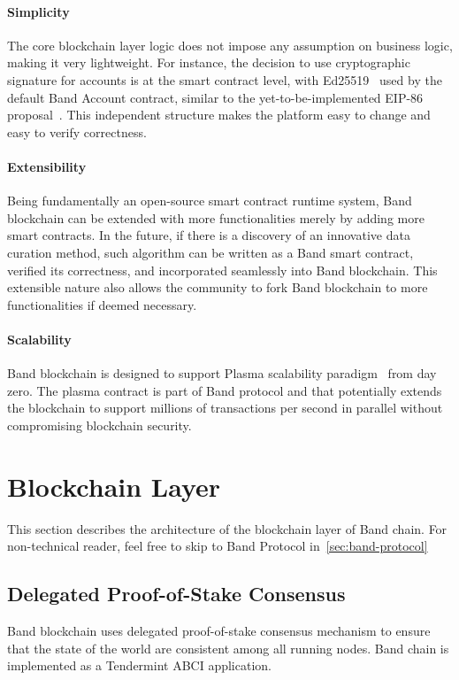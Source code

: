\documentclass[letterpaper,11pt]{article}
\begin{document}
\paragraph{Simplicity}
The core blockchain layer logic does not impose any assumption on business logic, making it very lightweight. For instance, the decision to use cryptographic signature for accounts is at the smart contract level, with Ed25519~\cite{bernstein2012high} used by the default Band Account contract, similar to the yet-to-be-implemented EIP-86 proposal~\cite{eip86,eip86research}. This independent structure makes the platform easy to change and easy to verify correctness.

\paragraph{Extensibility}
Being fundamentally an open-source smart contract runtime system, Band blockchain can be extended with more functionalities merely by adding more smart contracts. In the future, if there is a discovery of an innovative data curation method, such algorithm can be written as a Band smart contract, verified its correctness, and incorporated seamlessly into Band blockchain. This extensible nature also allows the community to fork Band blockchain to more functionalities if deemed necessary.

\paragraph{Scalability}
Band blockchain is designed to support Plasma scalability paradigm~\cite{poon2017plasma} from day zero. The plasma contract is part of Band protocol and that potentially extends the blockchain to support millions of transactions per second in parallel without compromising blockchain security.

\newpage

\section{Blockchain Layer} \label{sec:blockchain-layer}
This section describes the architecture of the blockchain layer of Band chain. For non-technical reader, feel free to skip to Band Protocol in~\cref{sec:band-protocol}

\subsection{Delegated Proof-of-Stake Consensus} \label{sec:dPOS}
Band blockchain uses delegated proof-of-stake consensus mechanism to ensure that the state of the world are consistent among all running nodes. Band chain is implemented as a Tendermint ABCI application. 
\end{document}
